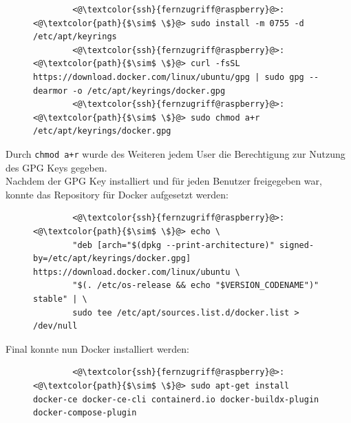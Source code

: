 \documentclass[a4paper, 11pt]{scrartcl}
\begin{document}
\begin{figure}[H]
    \begin{mdframed}[backgroundcolor=bbg]
        \begin{lstlisting}
        <@\textcolor{ssh}{fernzugriff@raspberry}@>:<@\textcolor{path}{$\sim$ \$}@> sudo install -m 0755 -d /etc/apt/keyrings
        <@\textcolor{ssh}{fernzugriff@raspberry}@>:<@\textcolor{path}{$\sim$ \$}@> curl -fsSL https://download.docker.com/linux/ubuntu/gpg | sudo gpg --dearmor -o /etc/apt/keyrings/docker.gpg
        <@\textcolor{ssh}{fernzugriff@raspberry}@>:<@\textcolor{path}{$\sim$ \$}@> sudo chmod a+r /etc/apt/keyrings/docker.gpg
        \end{lstlisting}
    \end{mdframed}
    \label{lst:install_gpg}
\end{figure}
Durch \lstinline[basicstyle={\small\ttfamily\color{black}}]|chmod a+r| wurde des Weiteren jedem User die Berechtigung zur Nutzung des
GPG Keys gegeben.
\\
Nachdem der GPG Key installiert und für jeden Benutzer freigegeben war, konnte das Repository für Docker aufgesetzt werden:
\begin{figure}[H]
    \begin{mdframed}[backgroundcolor=bbg]
        \begin{lstlisting}
        <@\textcolor{ssh}{fernzugriff@raspberry}@>:<@\textcolor{path}{$\sim$ \$}@> echo \
        "deb [arch="$(dpkg --print-architecture)" signed-by=/etc/apt/keyrings/docker.gpg] https://download.docker.com/linux/ubuntu \
        "$(. /etc/os-release && echo "$VERSION_CODENAME")" stable" | \
        sudo tee /etc/apt/sources.list.d/docker.list > /dev/null
        \end{lstlisting}
    \end{mdframed}
    \label{lst:setup_docker_repo}
\end{figure}
Final konnte nun Docker installiert werden:
\begin{figure}[H]
    \begin{mdframed}[backgroundcolor=bbg]
        \begin{lstlisting}
        <@\textcolor{ssh}{fernzugriff@raspberry}@>:<@\textcolor{path}{$\sim$ \$}@> sudo apt-get install docker-ce docker-ce-cli containerd.io docker-buildx-plugin docker-compose-plugin
        \end{lstlisting}
    \end{mdframed}
    \label{lst:install_docker}
\end{figure}
\end{document}
